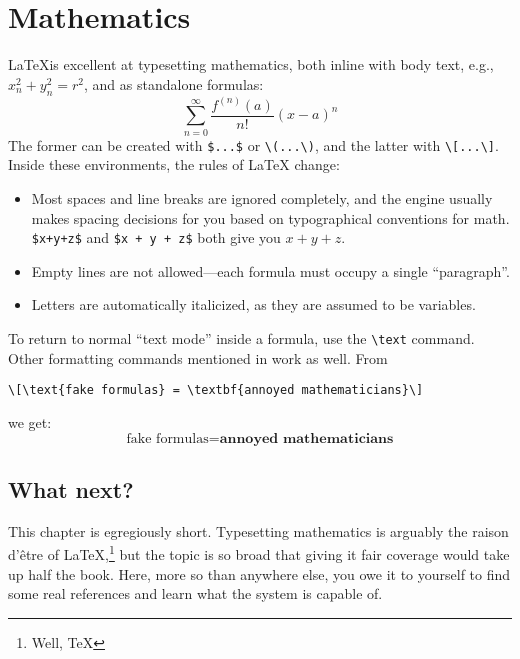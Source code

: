 \chapter{Mathematics}

\LaTeX is excellent at typesetting mathematics, both inline with body text,
e.g., $x_n^2+y_n^2=r^2$, and as standalone formulas:
\[\sum_{n=0}^{\infty} \frac{f^{(n)} (a)}{n!} (x - a)^n\]
The former can be created with \verb|$...$| or \verb|\(...\)|,
and the latter with \verb|\[...\]|.
Inside these environments, the rules of \LaTeX{} change:
\begin{itemize}
\item Most spaces and line breaks are ignored completely,
    and the engine usually makes spacing decisions for you based on
    typographical conventions for math.
    \verb|$x+y+z$| and \verb|$x + y + z$| both give you $x+y+z$.
\item Empty lines are not allowed---each formula must occupy a single
    ``paragraph''\quotekern.
\item Letters are automatically italicized, as they are assumed to be variables.
\end{itemize}
To return to normal ``text mode'' inside a formula, use the \verb|\text| command.
Other formatting commands mentioned in  work as well.
From
\begin{leftfigure}
\begin{lstlisting}
\[\text{fake formulas} = \textbf{annoyed mathematicians}\]
\end{lstlisting}
\end{leftfigure}
we get:
\[\text{fake formulas} = \textbf{annoyed mathematicians}\]

\section{What next?}

This chapter is egregiously short.
Typesetting mathematics is arguably the raison d'être of
\LaTeX,\punckern\footnote{Well, \TeX} but the topic is so broad that giving
it fair coverage would take up half the book.
Here, more so than anywhere else,
you owe it to yourself to find some real references and learn what the system
is capable of.
